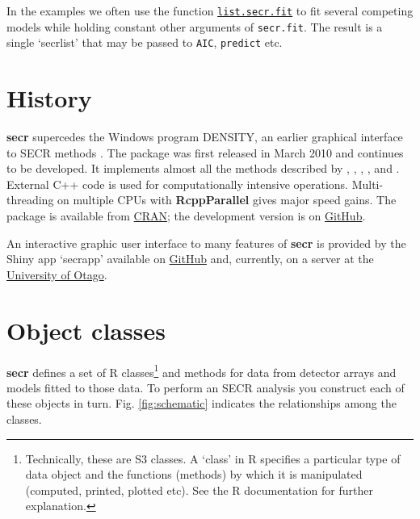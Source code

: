 \documentclass[
]{book}
\begin{document}
In the examples we often use the function \href{https://www.otago.ac.nz/density/html/list.secr.fit.html}{\texttt{list.secr.fit}} to fit several competing models while holding constant other arguments of \texttt{secr.fit}. The result is a single `secrlist' that may be passed to \texttt{AIC}, \texttt{predict} etc.

\section{History}\label{history}

\textbf{secr} supercedes the Windows program DENSITY, an earlier graphical interface to SECR methods \citep{edr04, e12}. The package was first released in March 2010 and continues to be developed. It implements almost all the methods described by \citet{be08}, \citet{ebb09}, \citet{e11}, \citet{ef13}, \citet{ebm13} and \citet{em14}. External C++ code \citep{R-Rcpp} is used for computationally intensive operations. Multi-threading on multiple CPUs with \textbf{RcppParallel} \citep{R-RcppParallel} gives major speed gains. The package is available from \href{https://CRAN.R-project.org/package=ipsecr}{CRAN}; the development version is on \href{https://github.com/MurrayEfford/secr}{GitHub}.

An interactive graphic user interface to many features of \textbf{secr} is provided by the Shiny app `secrapp' available on \href{https://github.com/MurrayEfford/secrapp}{GitHub} and, currently, on a server at the \href{https://www.stats.otago.ac.nz/secrapp/}{University of Otago}.

\section{Object classes}\label{object-classes}


\textbf{secr} defines a set of R classes\footnote{Technically, these are S3 classes. A `class' in R specifies a particular type of data object and the functions (methods) by which it is manipulated (computed, printed, plotted etc). See the R documentation for further explanation.} and methods for data from detector arrays and models fitted to those data. To perform an SECR analysis you construct each of these objects in turn. Fig. \ref{fig:schematic} indicates the relationships among the classes.
\end{document}
